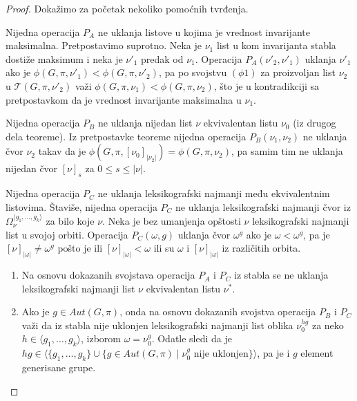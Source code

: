 \documentclass[12pt,oneside]{memoir}
\theoremstyle{definition}
\begin{document}
  \begin{proof}
	  Dokažimo za početak nekoliko pomoćnih tvrđenja.

	  Nijedna operacija $P_A$ ne uklanja listove u kojima je vrednost
	  invarijante maksimalna. Pretpostavimo suprotno. Neka je $\nu_1$ list u
	  kom invarijanta stabla dostiže maksimum i neka je $\nu'_1$ predak od
	  $\nu_1$. Operacija $P_A(\nu'_2, \nu'_1)$ uklanja $\nu'_1$ ako je $\phi(G,
	  \pi, \nu'_1) < \phi(G, \pi, \nu'_2)$, pa po svojstvu $(\phi1)$ za
	  proizvoljan list $\nu_2$ u $\mathcal{T}(G, \pi, \nu'_2)$ važi $\phi(G,
	  \pi, \nu_1) < \phi(G, \pi, \nu_2)$, što je u kontradikciji sa
	  pretpostavkom da je vrednost invarijante maksimalna u $\nu_1$.

	  Nijedna operacija $P_B$ ne uklanja nijedan list $\nu$ ekvivalentan listu
	  $\nu_0$ (iz drugog dela teoreme). Iz pretpostavke teoreme nijedna
	  operacija $P_B(\nu_1, \nu_2)$ ne uklanja čvor $\nu_2$ takav da je
	  $\phi(G, \pi, [\nu_0]_{|\nu_2|}) = \phi(G, \pi, \nu_2)$, pa samim tim ne
	  uklanja nijedan čvor $[\nu]_{s}$ za $0 \leq s \leq |\nu|$.

	  Nijedna operacija $P_C$ ne uklanja leksikografski najmanji među
	  ekvivalentnim listovima. Štaviše, nijedna operacija $P_C$ ne uklanja
	  leksikografski najmanji čvor iz $\Omega_\nu^{\langle g_1, \dots, g_k
	  \rangle}$ za bilo koje $\nu$. Neka je bez umanjenja opštosti $\nu$
	  leksikografski najmanji list u svojoj orbiti. Operacija $P_C(\omega, g)$
	  uklanja čvor $\omega^g$ ako je $\omega < \omega^g$, pa je
	  $[\nu]_{|\omega|} \neq \omega^g$ pošto je ili $[\nu]_{|\omega|} < \omega$
	  ili su $\omega$ i $[\nu]_{|\omega|}$ iz različitih orbita.
	  \begin{enumerate}
		  \item Na osnovu dokazanih svojstava operacija $P_A$ i $P_C$ iz stabla
			  se ne uklanja leksikografski najmanji list $\nu$ ekvivalentan
			  listu $\nu^*$.
		  \item Ako je $g \in Aut(G, \pi)$, onda na osnovu dokazanih svojstva
			  operacija $P_B$ i $P_C$ važi da iz stabla nije uklonjen
			  leksikografski najmanji list oblika $\nu_0^{hg}$ za neko $h \in \langle
			  g_1, \dots, g_k \rangle$, izborom $\omega =
			  \nu_0^g$. Odatle sledi da je $hg \in \langle \{g_1, \dots,
			  g_k\} \cup \{g \in Aut(G, \pi) \mid \nu_0^g \text{ nije
			  uklonjen}\} \rangle$, pa je i $g$ element generisane
			  grupe.
	  \end{enumerate}
  \end{proof}
\end{document}

